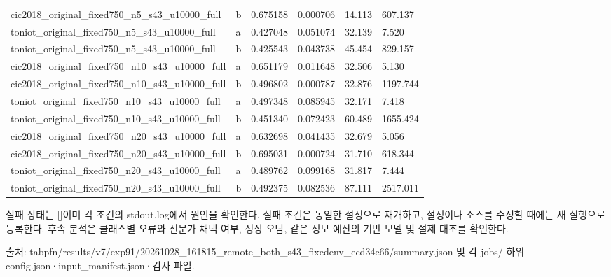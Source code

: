 \begin{longtable}
{}cic2018\_\allowbreak{}original\_\allowbreak{}fixed750\_\allowbreak{}n5\_\allowbreak{}s43\_\allowbreak{}u10000\_\allowbreak{}full & b & 0.675158 & 0.000706 & 14.113 & 607.137 \\
{}toniot\_\allowbreak{}original\_\allowbreak{}fixed750\_\allowbreak{}n5\_\allowbreak{}s43\_\allowbreak{}u10000\_\allowbreak{}full & a & 0.427048 & 0.051074 & 32.139 & 7.520 \\
{}toniot\_\allowbreak{}original\_\allowbreak{}fixed750\_\allowbreak{}n5\_\allowbreak{}s43\_\allowbreak{}u10000\_\allowbreak{}full & b & 0.425543 & 0.043738 & 45.454 & 829.157 \\
{}cic2018\_\allowbreak{}original\_\allowbreak{}fixed750\_\allowbreak{}n10\_\allowbreak{}s43\_\allowbreak{}u10000\_\allowbreak{}full & a & 0.651179 & 0.011648 & 32.506 & 5.130 \\
{}cic2018\_\allowbreak{}original\_\allowbreak{}fixed750\_\allowbreak{}n10\_\allowbreak{}s43\_\allowbreak{}u10000\_\allowbreak{}full & b & 0.496802 & 0.000787 & 32.876 & 1197.744 \\
{}toniot\_\allowbreak{}original\_\allowbreak{}fixed750\_\allowbreak{}n10\_\allowbreak{}s43\_\allowbreak{}u10000\_\allowbreak{}full & a & 0.497348 & 0.085945 & 32.171 & 7.418 \\
{}toniot\_\allowbreak{}original\_\allowbreak{}fixed750\_\allowbreak{}n10\_\allowbreak{}s43\_\allowbreak{}u10000\_\allowbreak{}full & b & 0.451340 & 0.072423 & 60.489 & 1655.424 \\
{}cic2018\_\allowbreak{}original\_\allowbreak{}fixed750\_\allowbreak{}n20\_\allowbreak{}s43\_\allowbreak{}u10000\_\allowbreak{}full & a & 0.632698 & 0.041435 & 32.679 & 5.056 \\
{}cic2018\_\allowbreak{}original\_\allowbreak{}fixed750\_\allowbreak{}n20\_\allowbreak{}s43\_\allowbreak{}u10000\_\allowbreak{}full & b & 0.695031 & 0.000724 & 31.710 & 618.344 \\
{}toniot\_\allowbreak{}original\_\allowbreak{}fixed750\_\allowbreak{}n20\_\allowbreak{}s43\_\allowbreak{}u10000\_\allowbreak{}full & a & 0.489762 & 0.099168 & 31.817 & 7.444 \\
{}toniot\_\allowbreak{}original\_\allowbreak{}fixed750\_\allowbreak{}n20\_\allowbreak{}s43\_\allowbreak{}u10000\_\allowbreak{}full & b & 0.492375 & 0.082536 & 87.111 & 2517.011 \\
\bottomrule
\end{longtable}
\endgroup
실패 상태는 []이며 각 조건의 stdout.log에서 원인을 확인한다. 실패 조건은 동일한 설정으로 재개하고, 설정이나 소스를 수정할 때에는 새 실행으로 등록한다. 후속 분석은 클래스별 오류와 전문가 채택 여부, 정상 오탐, 같은 정보 예산의 기반 모델 및 절제 대조를 확인한다.

출처: tabpfn/\allowbreak{}results/\allowbreak{}v7/\allowbreak{}exp91/\allowbreak{}20261028\_\allowbreak{}161815\_\allowbreak{}remote\_\allowbreak{}both\_\allowbreak{}s43\_\allowbreak{}fixedenv\_\allowbreak{}ecd34e66/\allowbreak{}summary.json 및 각 jobs/\allowbreak{} 하위 config.json·input\_\allowbreak{}manifest.json·감사 파일.



